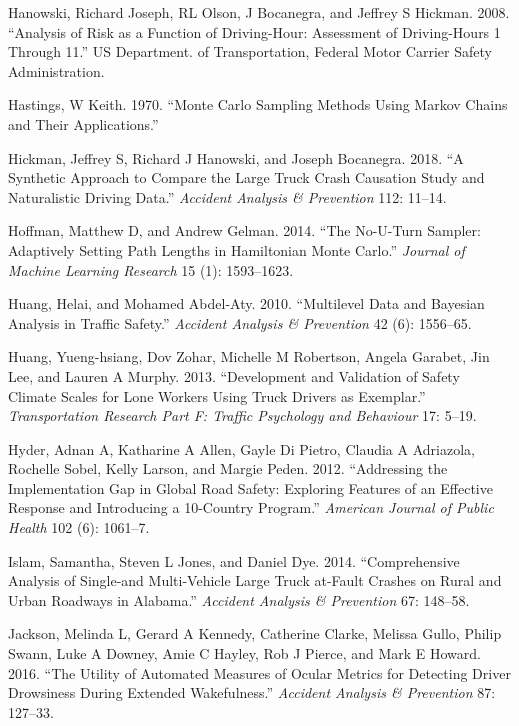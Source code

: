 \documentclass[12pt]{book}
\numberwithin{equation}{chapter}
\begin{document}
\leavevmode\hypertarget{ref-hanowski2008analysis}{}%
Hanowski, Richard Joseph, RL Olson, J Bocanegra, and Jeffrey S Hickman. 2008. ``Analysis of Risk as a Function of Driving-Hour: Assessment of Driving-Hours 1 Through 11.'' US Department. of Transportation, Federal Motor Carrier Safety Administration.

\leavevmode\hypertarget{ref-hastings1970monte}{}%
Hastings, W Keith. 1970. ``Monte Carlo Sampling Methods Using Markov Chains and Their Applications.''

\leavevmode\hypertarget{ref-hickman2018synthetic}{}%
Hickman, Jeffrey S, Richard J Hanowski, and Joseph Bocanegra. 2018. ``A Synthetic Approach to Compare the Large Truck Crash Causation Study and Naturalistic Driving Data.'' \emph{Accident Analysis \& Prevention} 112: 11--14.

\leavevmode\hypertarget{ref-hoffman2014no}{}%
Hoffman, Matthew D, and Andrew Gelman. 2014. ``The No-U-Turn Sampler: Adaptively Setting Path Lengths in Hamiltonian Monte Carlo.'' \emph{Journal of Machine Learning Research} 15 (1): 1593--1623.

\leavevmode\hypertarget{ref-huang2010multilevel}{}%
Huang, Helai, and Mohamed Abdel-Aty. 2010. ``Multilevel Data and Bayesian Analysis in Traffic Safety.'' \emph{Accident Analysis \& Prevention} 42 (6): 1556--65.

\leavevmode\hypertarget{ref-huang2013development}{}%
Huang, Yueng-hsiang, Dov Zohar, Michelle M Robertson, Angela Garabet, Jin Lee, and Lauren A Murphy. 2013. ``Development and Validation of Safety Climate Scales for Lone Workers Using Truck Drivers as Exemplar.'' \emph{Transportation Research Part F: Traffic Psychology and Behaviour} 17: 5--19.

\leavevmode\hypertarget{ref-hyder2012addressing}{}%
Hyder, Adnan A, Katharine A Allen, Gayle Di Pietro, Claudia A Adriazola, Rochelle Sobel, Kelly Larson, and Margie Peden. 2012. ``Addressing the Implementation Gap in Global Road Safety: Exploring Features of an Effective Response and Introducing a 10-Country Program.'' \emph{American Journal of Public Health} 102 (6): 1061--7.

\leavevmode\hypertarget{ref-islam2014comprehensive}{}%
Islam, Samantha, Steven L Jones, and Daniel Dye. 2014. ``Comprehensive Analysis of Single-and Multi-Vehicle Large Truck at-Fault Crashes on Rural and Urban Roadways in Alabama.'' \emph{Accident Analysis \& Prevention} 67: 148--58.

\leavevmode\hypertarget{ref-jackson2016utility}{}%
Jackson, Melinda L, Gerard A Kennedy, Catherine Clarke, Melissa Gullo, Philip Swann, Luke A Downey, Amie C Hayley, Rob J Pierce, and Mark E Howard. 2016. ``The Utility of Automated Measures of Ocular Metrics for Detecting Driver Drowsiness During Extended Wakefulness.'' \emph{Accident Analysis \& Prevention} 87: 127--33.
\end{document}
